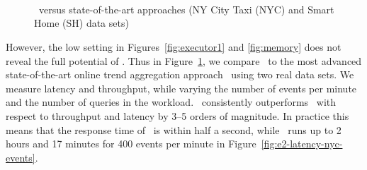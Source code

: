 \begin{figure}[!htb]
	\centering
    \hspace{-8pt}
	\\
%
	\hspace{-8pt}
	\\
	\hspace{-8pt}
	\\
%
	\hspace{-8pt}
    \caption{\app\ versus state-of-the-art approaches (NY City Taxi (NYC) and Smart Home (SH) data sets)}
    \label{fig:executor2}
\end{figure}

However, the low setting in Figures~\ref{fig:executor1} and \ref{fig:memory} does not reveal the full potential of \app. Thus in Figure~\ref{fig:executor2}, we compare \app\ to the most advanced state-of-the-art online trend aggregation approach \greta\ using two real data sets. We measure latency and throughput, while varying the number of events per minute and the number of queries in the workload. 
%
\app\ consistently outperforms \greta\ with respect to throughput and latency by 3--5 orders of magnitude. In practice this means that the response time of \app\ is within half a second, while \greta\ runs up to 2 hours and 17 minutes for 400 events per minute in Figure~\ref{fig:e2-latency-nyc-events}.

